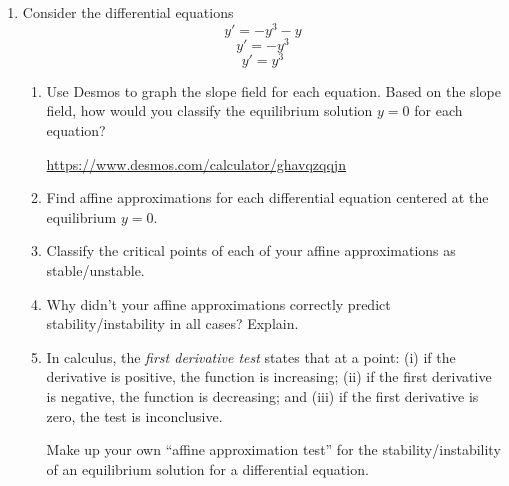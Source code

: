 \begin{enumerate}
	\item Consider the differential equations
	      \begin{equation}
		      y'=-y^3-y \tag{A}
	      \end{equation}
	      \begin{equation}
		      y'=-y^3 \tag{B}
	      \end{equation}
	      \begin{equation}
		      y'=y^3 \tag{C}
	      \end{equation}
	      \begin{enumerate}
			  \item Use Desmos to graph the slope field for each equation. Based on the slope
				  field, how would you classify the equilibrium solution $y=0$ for each equation?

				  \url{https://www.desmos.com/calculator/ghavqzqqjn}
		      \item Find affine approximations for each differential equation centered at the equilibrium $y=0$.
		      \item Classify the critical points of each of your affine approximations as stable/unstable.
		      \item Why didn't your affine approximations correctly predict stability/instability in all cases? Explain.
			  \item In calculus, the \emph{first derivative test} states that at a point:
				  (i) if the derivative is positive, the function is increasing; (ii) 
				  if
				  the first derivative is negative, the function is decreasing; and
				  (iii) if the first derivative is zero, the test is inconclusive.

		            Make up your own ``affine approximation test'' for the stability/instability of an equilibrium solution
		            for a differential equation.
	      \end{enumerate}


\end{enumerate}
